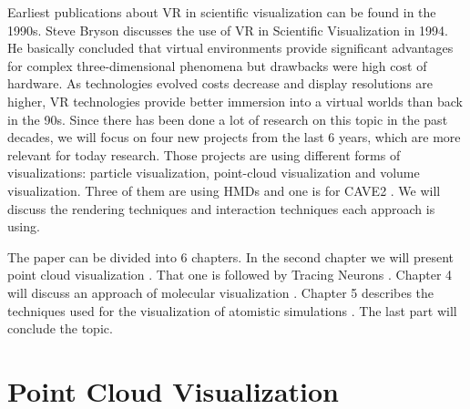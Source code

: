 \documentclass[10pt,twocolumn,letterpaper]{article}
\begin{document}
\setlength{\parindent}{1pc}Earliest publications about VR in scientific visualization can be found in the 1990s. Steve Bryson \cite{bryson1994virtual} discusses the use of VR in Scientific Visualization in 1994. He basically concluded that virtual environments provide significant advantages for complex three-dimensional phenomena but drawbacks were high cost of hardware. As technologies evolved costs decrease and display resolutions are higher, VR technologies provide better immersion into a virtual worlds than back in the 90s. Since there has been done a lot of research on this topic in the past decades, we will focus on four new projects from the last 6 years, which are more relevant for today research. Those projects are using different forms of visualizations: particle visualization, point-cloud visualization and volume visualization. Three of them are using HMDs and one is for CAVE2 \cite{febretti2013cave2}. We will discuss the rendering techniques and interaction techniques each approach is using.

\setlength{\parindent}{1pc}The paper can be divided into 6 chapters. In the second chapter we will present point cloud visualization \cite{discher_point-based_2018}. That one is followed by Tracing Neurons \cite{}. Chapter 4 will discuss an approach of molecular visualization \cite{}. Chapter 5 describes the techniques used for the visualization of atomistic simulations \cite{reda_visualizing_2013}. The last part will conclude the topic.

\section{Point Cloud Visualization}
\end{document}
